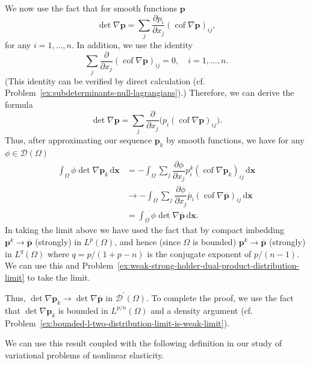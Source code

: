 \begin{Proof}
We now use the fact that for smooth functions $\bm{p}$
\begin{equation}\label{eq:gradient-determinant-cofactor-row-expansion}
\det\nabla\bm{p}=\sum_j\dfrac{\partial p_i}{\partial x_j}(\operatorname{cof}\nabla\bm{p})_{ij},
\end{equation}
for any $i=1,\ldots,n$. In addition, we use the identity
\begin{equation}\label{eq:gradient-cofactor-row-divergence-identity}
\sum_j\dfrac{\partial}{\partial x_j}(\operatorname{cof}\nabla\bm{p})_{ij}=0,\quad i=1,\ldots,n.
\end{equation}
(This identity can be verified by direct calculation (cf. Problem~\ref{ex:subdeterminants-null-lagrangians}).) Therefore, we can derive the formula
\begin{equation}\label{eq:gradient-determinant-divergence-form}
\det\nabla\bm{p}=\sum_j\dfrac{\partial}{\partial x_j}\bigl(p_i(\operatorname{cof}\nabla\bm{p})_{ij}\bigr).
\end{equation}
Thus, after approximating our sequence $\bm{p}_k$ by smooth functions, we have for any $\phi\in\mathcal{D}(\Omega)$\[
\begin{aligned}
 \int_\Omega\phi\det\nabla\bm{p}_k\,\mathrm{d}\bm{x}&=-\int_\Omega\sum_j\dfrac{\partial\phi}{\partial x_j}p_i^k(\operatorname{cof}\nabla\bm{p}_k)_{ij}\,\mathrm{d}\bm{x}\\
 &\to-\int_\Omega\sum_j\dfrac{\partial\phi}{\partial x_j}\overline p_i(\operatorname{cof}\nabla\overline{\bm{p}})_{ij}\,\mathrm{d}\bm{x}\\
 &=\int_\Omega\phi\det\nabla\overline{\bm{p}}\,\mathrm{d}\bm{x}.
\end{aligned}
\]In taking the limit above we have used the fact that by compact imbedding $\bm{p}^k\to\overline{\bm{p}}$ (strongly) in $L^p(\Omega)$, and hence (since $\Omega$ is bounded) $\bm{p}^k\to\overline{\bm{p}}$ (strongly) in $L^q(\Omega)$ where $q=p/(1+p-n)$ is the conjugate exponent of $p/(n-1)$. We can use this and Problem~\ref{ex:weak-strong-holder-dual-product-distribution-limit} to take the limit.

Thus, $\det\nabla\bm{p}_k\to\det\nabla\overline{\bm{p}}$ in $\mathcal{D}^{\prime}(\Omega)$. To complete the proof, we use the fact that $\det\nabla\bm{p}_k$ is bounded in $L^{p/n}(\Omega)$ and a density argument (cf. Problem~\ref{ex:bounded-l-two-distribution-limit-is-weak-limit}).
\end{Proof}
\endgroup

We can use this result coupled with the following definition in our study of variational problems of nonlinear elasticity.


